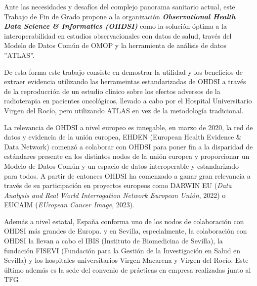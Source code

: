 Ante las necesidades y desafíos del complejo panorama sanitario actual, este Trabajo de Fin de Grado propone a la organización \textbf{\textit{Observational Health Data Science \& Informatics (OHDSI)}} como la solución óptima a la interoperabilidad en estudios observacionales con datos de salud, través del Modelo de Datos Común de OMOP y la herramienta de análisis de datos ''ATLAS''. 

De esta forma este trabajo consiste en demostrar la utilidad y los beneficios de extraer evidencia utilizando las herrameintas estandarizadas de OHDSI a través de la reproducción de un estudio clínico sobre los efectos adversos de la radioterapia en pacientes oncológicos, llevado a cabo por el Hospital Universitario Virgen del Rocío, pero utilizando ATLAS en vez de la metodología tradicional.

La relevancia de OHDSI a nivel europeo es innegable, en marzo de 2020, la red de datos y evidencia de la unión europea, EHDEN (European Health Evidence \& Data Network) comenzó a colaborar con OHDSI para poner fin a la disparidad de estándares presente en los distintos nodos de la unión europea y proporcionar un Modelo de Datos Común y un espacio de datos interoperable y estandarizado para todos. A partir de entonces OHDSI ha comenzado a ganar gran relevancia a través de su participación en proyectos europeos como DARWIN EU (\textit{Data Analysis and Real World Interrogation Network European Unión}, 2022) \cite{OHDSI2023Darwin} %
o EUCAIM (\textit{EUropean Cancer Image}, 2023).%

Además a nivel estatal, España conforma uno de los nodos de colaboración con OHDSI más grandes de Europa. %
y en Sevilla, especialmente, la colaboración con OHDSI la llevan a cabo el IBIS (Instituto de Biomedicina de Sevilla), la fundación FISEVI (Fundación para la Gestión de la Investigación en Salud en Sevilla) y los hospitales universitarios Virgen Macarena y Virgen del Rocío. Este último además es la sede del convenio de prácticas en empresa realizadas junto al TFG . %


